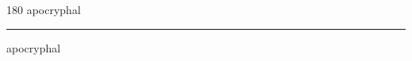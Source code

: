 
\begin{frame}
\begin{center}
\begin{turn}{180}
{\fontsize{2.5cm}{1em}\selectfont apocryphal}
\end{turn}
\vspace{1em}\par  
\hrule
\vspace{1em}\par  
{\fontsize{2.5cm}{1em}\selectfont apocryphal}
\end{center}
\end{frame}
